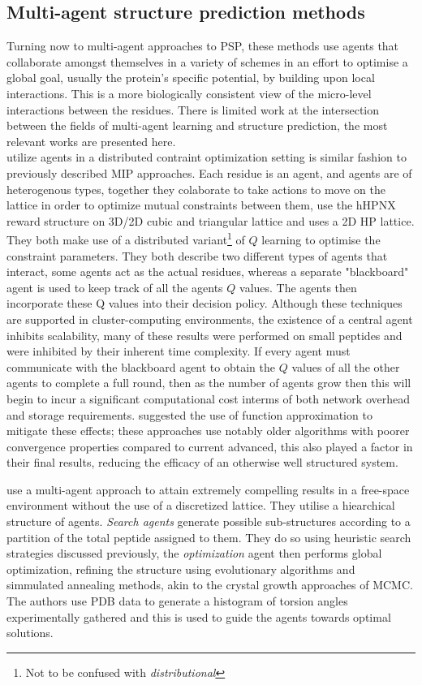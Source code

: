 \subsection{Multi-agent structure prediction methods}
Turning now to multi-agent approaches to PSP, these methods use agents that collaborate
amongst themselves in a variety of schemes in an effort to optimise a global goal, usually the protein's specific
potential, by building upon local interactions. This is a more biologically consistent view of the micro-level
interactions between the residues. There is limited work at the intersection between the fields of multi-agent learning
and structure prediction, the most relevant works are presented here.\\

 \cite{Muscalagiu2013,Czibula2011} utilize agents in a distributed contraint optimization setting is similar fashion to previously described MIP
 approaches. Each residue is an agent, and agents are of heterogenous types, together they colaborate to take
 actions to move on the lattice in order to optimize mutual constraints between them,
 \cite{Muscalagiu2013} use the hHPNX reward structure on 3D/2D cubic and triangular lattice and \cite{Czibula2011} uses a 2D HP lattice.
 They both make use of a distributed variant\footnote{Not to be confused with \emph{distributional}} of $Q$ learning to optimise the constraint parameters. They both
 describe two different types of agents that interact, some agents act as the actual residues, whereas
 a separate "blackboard" agent is used to keep track of all the agents $Q$ values. The agents then 
 incorporate these Q values into their decision policy. Although these techniques are supported in cluster-computing
 environments, the existence of a central agent inhibits scalability, many of these results were performed 
 on small peptides and were inhibited by their inherent time complexity. If every agent must communicate with 
 the blackboard agent to obtain the $Q$ values of all the other agents to complete a full round, then as the number
 of agents grow then this will begin to incur a significant computational cost interms of both network overhead and
 storage requirements. \cite{Czibula2011} suggested the use of function approximation to mitigate these effects;
 these approaches use notably older algorithms with poorer convergence properties compared to current advanced,
 this also played a factor in their final results, reducing the efficacy of an otherwise well structured system.

 \cite{deLimaCorrea2017} use a multi-agent approach to attain extremely compelling results in a free-space environment
 without the use of a discretized lattice. They utilise a hiearchical structure of agents. \emph{Search agents} generate possible
 sub-structures according to a partition of the total peptide assigned to them. They do so using heuristic search strategies 
 discussed previously, the \emph{optimization} agent then performs global optimization, refining the structure
 using evolutionary algorithms and simmulated annealing methods, akin to the crystal growth approaches of MCMC.
 The authors use PDB data to generate a histogram of torsion angles experimentally gathered and this is used to 
 guide the agents towards optimal solutions.